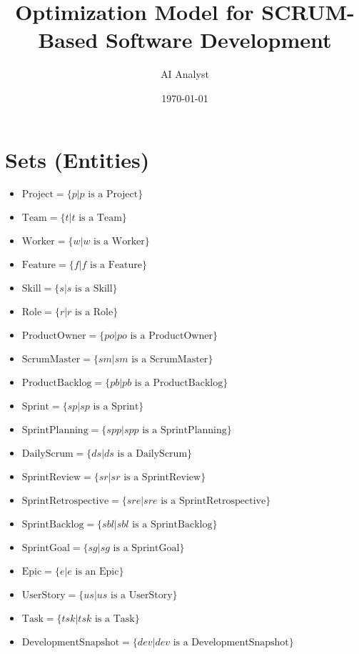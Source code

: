 \documentclass[11pt]{article}
\title{Optimization Model for SCRUM-Based Software Development}
\author{AI Analyst}
\date{\today}
\begin{document}
\maketitle
\tableofcontents
\newpage

\section{Sets (Entities)}
\begin{itemize}
    \item $\text{Project} = \{p | p \text{ is a Project}\}$
    \item $\text{Team} = \{t | t \text{ is a Team}\}$
    \item $\text{Worker} = \{w | w \text{ is a Worker}\}$
    \item $\text{Feature} = \{f | f \text{ is a Feature}\}$
    \item $\text{Skill} = \{s | s \text{ is a Skill}\}$
    \item $\text{Role} = \{r | r \text{ is a Role}\}$
    \item $\text{ProductOwner} = \{po | po \text{ is a ProductOwner}\}$
    \item $\text{ScrumMaster} = \{sm | sm \text{ is a ScrumMaster}\}$
    \item $\text{ProductBacklog} = \{pb | pb \text{ is a ProductBacklog}\}$
    \item $\text{Sprint} = \{sp | sp \text{ is a Sprint}\}$
    \item $\text{SprintPlanning} = \{spp | spp \text{ is a SprintPlanning}\}$
    \item $\text{DailyScrum} = \{ds | ds \text{ is a DailyScrum}\}$
    \item $\text{SprintReview} = \{sr | sr \text{ is a SprintReview}\}$
    \item $\text{SprintRetrospective} = \{sre | sre \text{ is a SprintRetrospective}\}$
    \item $\text{SprintBacklog} = \{sbl | sbl \text{ is a SprintBacklog}\}$
    \item $\text{SprintGoal} = \{sg | sg \text{ is a SprintGoal}\}$
    \item $\text{Epic} = \{e | e \text{ is an Epic}\}$
    \item $\text{UserStory} = \{us | us \text{ is a UserStory}\}$
    \item $\text{Task} = \{tsk | tsk \text{ is a Task}\}$
    \item $\text{DevelopmentSnapshot} = \{dev | dev \text{ is a DevelopmentSnapshot}\}$

\end{itemize}
\end{document}
